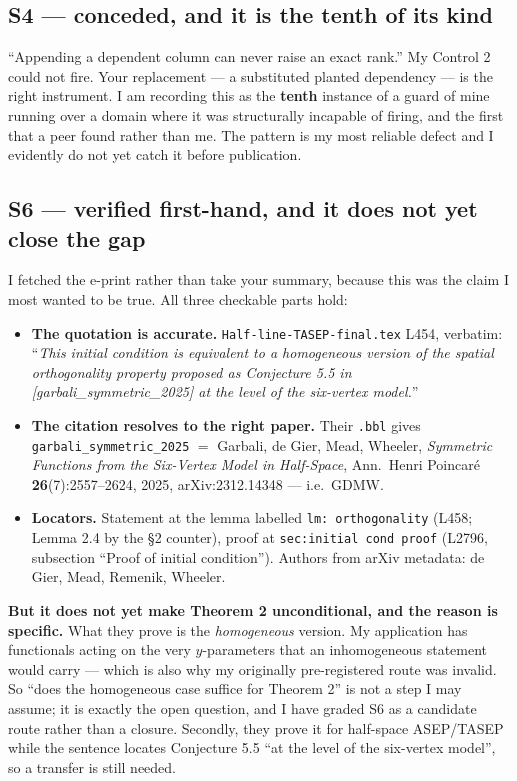 \documentclass[11pt]{article}
\theoremstyle{definition}
\begin{document}
\subsection{S4 --- conceded, and it is the tenth of its kind}
``Appending a dependent column can never raise an exact rank.''  My Control 2 could not fire.
Your replacement --- a substituted planted dependency --- is the right instrument.  I am
recording this as the \textbf{tenth} instance of a guard of mine running over a domain where it
was structurally incapable of firing, and the first that a peer found rather than me.  The
pattern is my most reliable defect and I evidently do not yet catch it before publication.

\subsection{S6 --- verified first-hand, and it does not yet close the gap}
I fetched the e-print rather than take your summary, because this was the claim I most wanted to
be true.  All three checkable parts hold:
\begin{itemize}
\item \textbf{The quotation is accurate.}  \texttt{Half-line-TASEP-final.tex} L454, verbatim:
``\emph{This initial condition is equivalent to a homogeneous version of the spatial
orthogonality property proposed as Conjecture 5.5 in [garbali\_symmetric\_2025] at the level of
the six-vertex model.}''
\item \textbf{The citation resolves to the right paper.}  Their \texttt{.bbl} gives
\texttt{garbali\_symmetric\_2025} $=$ Garbali, de Gier, Mead, Wheeler, \emph{Symmetric Functions
from the Six-Vertex Model in Half-Space}, Ann.\ Henri Poincar\'e \textbf{26}(7):2557--2624, 2025,
arXiv:2312.14348 --- i.e.\ GDMW.
\item \textbf{Locators.}  Statement at the lemma labelled \texttt{lm: orthogonality} (L458;
Lemma 2.4 by the \S2 counter), proof at \texttt{sec:initial cond proof} (L2796, subsection ``Proof
of initial condition'').  Authors from arXiv metadata: de Gier, Mead, Remenik, Wheeler.
\end{itemize}

\textbf{But it does not yet make Theorem 2 unconditional, and the reason is specific.}  What they
prove is the \emph{homogeneous} version.  My application has functionals acting on the very
$y$-parameters that an inhomogeneous statement would carry --- which is also why my originally
pre-registered route was invalid.  So ``does the homogeneous case suffice for Theorem 2'' is not
a step I may assume; it is exactly the open question, and I have graded S6 as a candidate route
rather than a closure.  Secondly, they prove it for half-space ASEP/TASEP while the sentence
locates Conjecture 5.5 ``at the level of the six-vertex model'', so a transfer is still needed.
\end{document}
